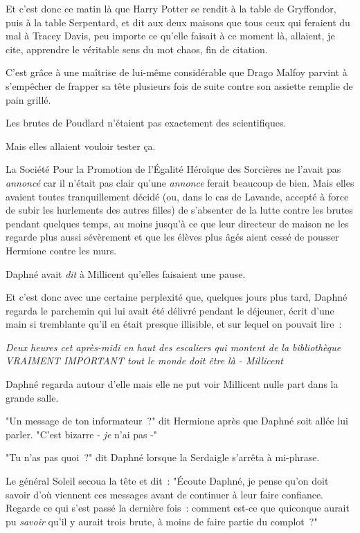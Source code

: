 \later

Et c'est donc ce matin là que Harry Potter se rendit à la table de Gryffondor, puis à la table Serpentard, et dit aux deux maisons que tous ceux qui feraient du mal à Tracey Davis, peu importe ce qu'elle faisait à ce moment là, allaient, je cite, apprendre le véritable sens du mot chaos, fin de citation.

C'est grâce à une maîtrise de lui-même considérable que Drago Malfoy parvint à s'empêcher de frapper sa tête plusieurs fois de suite contre son assiette remplie de pain grillé.

Les brutes de Poudlard n'étaient pas exactement des scientifiques.

Mais elles allaient vouloir tester ça.

\later

La Société Pour la Promotion de l'Égalité Héroïque des Sorcières ne l'avait pas \emph{annoncé} car il n'était pas clair qu'une \emph{annonce} ferait beaucoup de bien. Mais elles avaient toutes tranquillement décidé (ou, dans le cas de Lavande, accepté à force de subir les hurlements des autres filles) de s'absenter de la lutte contre les brutes pendant quelques temps, au moins jusqu'à ce que leur directeur de maison ne les regarde plus aussi sévèrement et que les élèves plus âgés aient cessé de pousser Hermione contre les murs.

Daphné avait \emph{dit} à Millicent qu'elles faisaient une pause.

Et c'est donc avec une certaine perplexité que, quelques jours plus tard, Daphné regarda le parchemin qui lui avait été délivré pendant le déjeuner, écrit d'une main si tremblante qu'il en était presque illisible, et sur lequel on pouvait lire~:

\emph{Deux heures cet après-midi en haut des escaliers qui montent de la bibliothèque VRAIMENT IMPORTANT tout le monde doit être là - Millicent}

Daphné regarda autour d'elle mais elle ne put voir Millicent nulle part dans la grande salle.

"Un message de ton informateur~?" dit Hermione après que Daphné soit allée lui parler. "C'est bizarre - \emph{je} n'ai pas -"

"Tu n'as pas quoi~?" dit Daphné lorsque la Serdaigle s'arrêta à mi-phrase.

Le général Soleil secoua la tête et dit~: "Écoute Daphné, je pense qu'on doit savoir d'où viennent ces messages avant de continuer à leur faire confiance. Regarde ce qui s'est passé la dernière fois~: comment est-ce que quiconque aurait pu \emph{savoir} qu'il y aurait trois brute, à moins de faire partie du complot~?"


